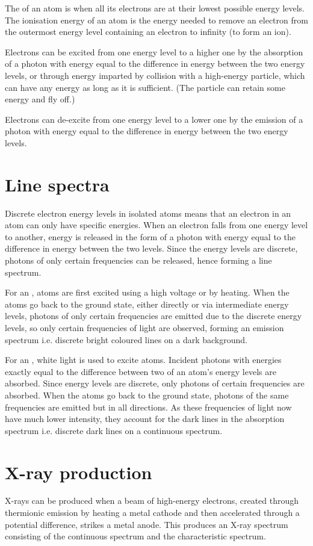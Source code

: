 \documentclass[Physics.tex]{subfiles}
\begin{document}
The  of an atom is when all its electrons are at their lowest possible energy levels. The ionisation energy of an atom is the energy needed to remove an electron from the outermost energy level containing an electron to infinity (to form an ion).

Electrons can be excited from one energy level to a higher one by the absorption of a photon with energy equal to the difference in energy between the two energy levels, or through energy imparted by collision with a high-energy particle, which can have any energy as long as it is sufficient. (The particle can retain some energy and fly off.)

Electrons can de-excite from one energy level to a lower one by the emission of a photon with energy equal to the difference in energy between the two energy levels.
\section{Line spectra}
Discrete electron energy levels in isolated atoms means that an electron in an atom can only have specific energies. When an electron falls from one energy level to another, energy is released in the form of a photon with energy equal to the difference in energy between the two levels. Since the energy levels are discrete, photons of only certain frequencies can be released, hence forming a line spectrum.

For an , atoms are first excited using a high voltage or by heating. When the atoms go back to the ground state, either directly or via intermediate energy levels, photons of only certain frequencies are emitted due to the discrete energy levels, so only certain frequencies of light are observed, forming an emission spectrum i.e. discrete bright coloured lines on a dark background.

For an , white light is used to excite atoms. Incident photons with energies exactly equal to the difference between two of an atom's energy levels are absorbed. Since energy levels are discrete, only photons of certain frequencies are absorbed. When the atoms go back to the ground state, photons of the same frequencies are emitted but in all directions. As these frequencies of light now have much lower intensity, they account for the dark lines in the absorption spectrum i.e. discrete dark lines on a continuous spectrum.
\section{X-ray production}
X-rays can be produced when a beam of high-energy electrons, created through thermionic emission by heating a metal cathode and then accelerated through a potential difference, strikes a metal anode. This produces an X-ray spectrum consisting of the continuous spectrum and the characteristic spectrum.
\end{document}
